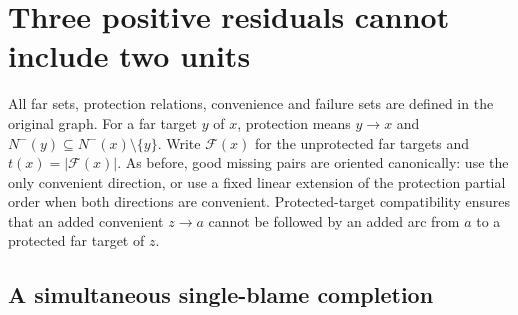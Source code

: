 \section{Three positive residuals cannot include two units}
\label{sec:three-positive-two-units}

All far sets, protection relations, convenience and failure sets are
defined in the original graph.
For a far target $y$ of $x$, protection means
$y\to x$ and $N^-(y)\subseteq N^-(x)\setminus\{y\}$.
Write $\mathcal F(x)$ for the unprotected far targets and
$t(x)=|\mathcal F(x)|$.
As before, good missing pairs are oriented canonically: use the only
convenient direction, or use a fixed linear extension of the protection
partial order when both directions are convenient.
Protected-target compatibility ensures that an added convenient
$z\to a$ cannot be followed by an added arc from $a$ to a protected
far target of $z$.

\subsection{A simultaneous single-blame completion}


